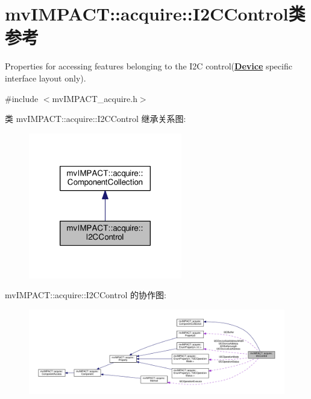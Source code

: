 \hypertarget{classmv_i_m_p_a_c_t_1_1acquire_1_1_i2_c_control}{\section{mv\+I\+M\+P\+A\+C\+T\+:\+:acquire\+:\+:I2\+C\+Control类 参考}
\label{classmv_i_m_p_a_c_t_1_1acquire_1_1_i2_c_control}
}


Properties for accessing features belonging to the I2\+C control({\bfseries \hyperlink{classmv_i_m_p_a_c_t_1_1acquire_1_1_device}{Device}} specific interface layout only).  




{\ttfamily \#include $<$mv\+I\+M\+P\+A\+C\+T\+\_\+acquire.\+h$>$}



类 mv\+I\+M\+P\+A\+C\+T\+:\+:acquire\+:\+:I2\+C\+Control 继承关系图\+:
\nopagebreak
\begin{figure}[H]
\begin{center}
\leavevmode
\includegraphics[width=190pt]{classmv_i_m_p_a_c_t_1_1acquire_1_1_i2_c_control__inherit__graph}
\end{center}
\end{figure}


mv\+I\+M\+P\+A\+C\+T\+:\+:acquire\+:\+:I2\+C\+Control 的协作图\+:
\nopagebreak
\begin{figure}[H]
\begin{center}
\leavevmode
\includegraphics[width=350pt]{classmv_i_m_p_a_c_t_1_1acquire_1_1_i2_c_control__coll__graph}
\end{center}
\end{figure}
